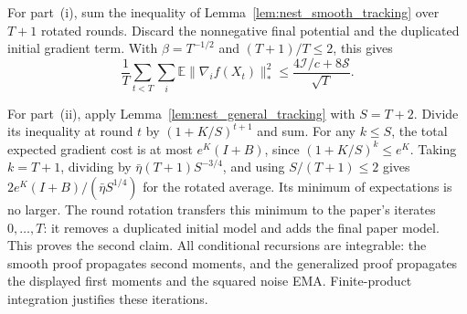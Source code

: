 \begin{codex}
\begin{paperproof}
For part~(i), sum the
inequality of Lemma~\ref{lem:nest_smooth_tracking} over $T+1$ rotated
rounds. Discard the nonnegative final potential and the duplicated initial
gradient term. With $\beta=T^{-1/2}$ and $(T+1)/T\le2$, this gives
\begin{equation}\label{eq:nest_smooth_rate}
 \frac1T\sum_{t<T}\sum_i\mathbb E\|\nabla_i f(X_t)\|_*^2
 \le\frac{4\mathcal I/c+8\mathcal S}{\sqrt T}.
\end{equation}

For part~(ii), apply Lemma~\ref{lem:nest_general_tracking} with $S=T+2$.
Divide its inequality at round $t$ by $(1+K/S)^{t+1}$ and sum.
For any $k\le S$, the total expected gradient cost is at most
$e^K(I+B)$, since $(1+K/S)^k\le e^K$.
Taking $k=T+1$, dividing by
$\bar\eta(T+1)S^{-3/4}$, and using $S/(T+1)\le2$ gives
$2e^K(I+B)/(\bar\eta S^{1/4})$ for the rotated average.
Its minimum of expectations is no larger. The round rotation transfers
this minimum to the paper's iterates $0,\ldots,T$: it removes a duplicated
initial model and adds the final paper model. This proves the second claim.
All conditional recursions are integrable: the smooth proof propagates second
moments, and the generalized proof propagates the displayed first moments and
the squared noise EMA. Finite-product integration justifies these iterations.
\end{paperproof}

\end{codex}

